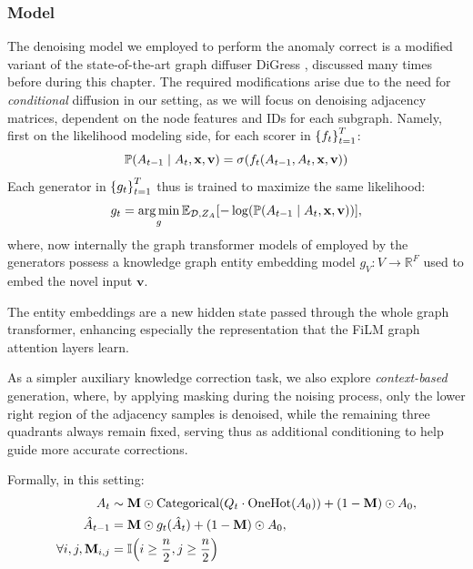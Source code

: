\subsubsection{Model}
The denoising model we employed to perform the anomaly correct is a modified variant of the state-of-the-art graph diffuser DiGress \cite{vignac_digress_2022}, discussed many times before during this chapter. The required modifications arise due to the need for \emph{conditional} diffusion in our setting, as we will focus on denoising adjacency matrices, dependent on the node features and IDs for each subgraph. 
Namely, first on the likelihood modeling side, for each scorer in $\mathopen{}\left\{f_t\right\}_{t=1}^T$:
\begin{equation}
    \mathbb{P}\mathopen{}\left(A_{t-1} \mid A_t, \mathbf{x}, \mathbf{v}\right)=\sigma\mathopen{}\left(f_t\mathopen{}\left(A_{t-1},A_t,\mathbf{x}, \mathbf{v}\right)\right)
\end{equation}
Each generator in $\mathopen{}\left\{g_t\right\}_{t=1}^T$ thus is trained to maximize the same likelihood:
\begin{equation}
    g_t=\operatorname*{arg\,min}_g{\mathbb{E}_{\mathcal{D},Z_A}\mathopen{}\left[-\log\mathopen{}\left(\mathbb{P}\mathopen{}\left(A_{t-1} \mid A_t, \mathbf{x}, \mathbf{v}\right)\right)\right]},
\end{equation}
where, now internally the graph transformer models of \cite{dwivedi_generalization_2021} employed by the generators possess a knowledge graph entity embedding model $g_V:V\to\mathbb{R}^F$ used to embed the novel input $\mathbf{v}$. 

The entity embeddings are a new hidden state passed through the whole graph transformer, enhancing especially the representation that the FiLM \cite{perez_film_2018} graph attention layers learn.

As a simpler auxiliary knowledge correction task, we also explore \emph{context-based} generation, where, by applying masking during the noising process, only the lower right region of the adjacency samples is denoised, while the remaining three quadrants always remain fixed, serving thus as additional conditioning to help guide more accurate corrections. 

Formally, in this setting:
\begin{align}
    \begin{split}
        A_t &\sim \mathbf{M} \odot \text{Categorical}\mathopen{}\left(Q_t \cdot \text{OneHot}\mathopen{}\left(A_0\right)\right) + \mathopen{}\left(1-\mathbf{M}\right) \odot A_0, \\
        \hat{A}_{t-1} &= \mathbf{M} \odot g_t(\hat{A}_t) + \mathopen{}\left(1-\mathbf{M}\right) \odot A_0, \\
        \forall i,j, \mathbf{M}_{i,j}&=\mathbb{I}\mathopen{}\left(i \geq \frac{n}{2}, j \geq \frac{n}{2}\right)
    \end{split}
\end{align}


